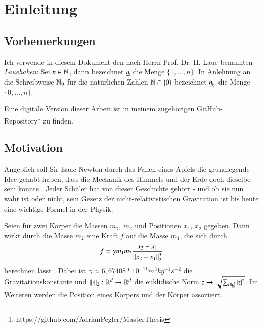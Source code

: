 \chapter{Einleitung}
\label{ch:einl}
  \section*{Vorbemerkungen}
    Ich verwende in diesem Dokument den nach Herrn Prof. Dr. H. Laue benannten \textit{Lauehaken}: Sei $n \in \mathbb{N}$, dann bezeichnet $\haken{n}$ die Menge $\{1, \dots ,n\}$.
    In Anlehnung an die Schreibweise $\mathbb{N}_0$ für die natürlichen Zahlen $\mathbb{N} \cap \{0\}$ bezeichnet $\nullhaken{n}$ die Menge $\{0, \dots , n\}$.
    
    Eine digitale Version dieser Arbeit ist in meinem zugehörigen GitHub-Repository\footnote{https://github.com/AdrianPegler/MasterThesis} zu finden.
    
    
  \section{Motivation}
  \label{sec:mot}
    Angeblich soll Sir Isaac Newton durch das Fallen eines Apfels die grundlegende Idee gehabt haben, dass die Mechanik des Himmels und der Erde doch dieselbe sein 
    könnte \citep{memoirs}. Jeder Schüler hat von dieser Geschichte gehört - und ob sie nun wahr ist oder nicht, sein Gesetz der nicht-relativistischen Gravitation ist bis
    heute eine wichtige Formel in der Physik.
    
    Seien für zwei Körper die Massen $m_1$, $m_2$ und Positionen $x_1$, $x_2$ gegeben. Dann wirkt durch die Masse $m_2$ eine Kraft $f$ auf die Masse $m_1$, die sich durch 
    \begin{equation}
      f = \gamma m_1 m_2 \frac{x_2 - x_1}{\left\lVert x_2 - x_1\right\rVert^3_2}
      \label{eq:simple_grav}
    \end{equation}
    berechnen lässt \citep{newton}. Dabei ist $\gamma \approx 6{,}67408*10^{-11} m^3 kg^{-1} s^{-2}$ die Gravitationskonstante \citep{graviconst} und $\left\lVert\cdot\right\rVert_2: \mathbb{R}^d \to \mathbb{R}^d$ die 
    euklidische Norm $z \mapsto \sqrt{ \sum_{i \in \haken{d}} |z|^2 }$. Im Weiteren werden die Position eines Körpers und der Körper assoziiert. 
    
